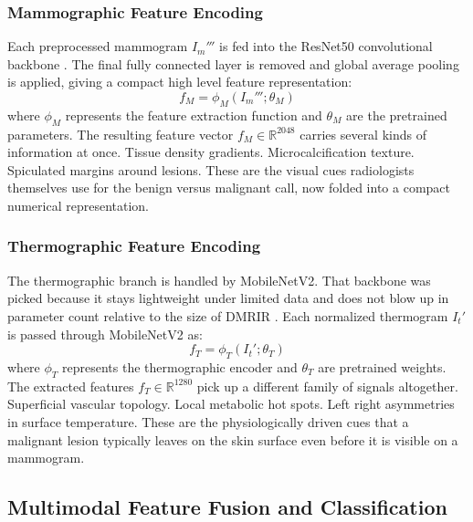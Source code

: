 \documentclass[lettersize,journal]{IEEEtran}
\begin{document}
\subsubsection{Mammographic Feature Encoding}

Each preprocessed mammogram $I_m'''$ is fed into the ResNet50 convolutional backbone \cite{He2016ResNet}. The final fully connected layer is removed and global average pooling is applied, giving a compact high level feature representation:
\begin{equation}
f_M = \phi_M(I_m'''; \theta_M)
\label{eq:resnet}
\end{equation}
where $\phi_M$ represents the feature extraction function and $\theta_M$ are the pretrained parameters. The resulting feature vector $f_M \in \mathbb{R}^{2048}$ carries several kinds of information at once. Tissue density gradients. Microcalcification texture. Spiculated margins around lesions. These are the visual cues radiologists themselves use for the benign versus malignant call, now folded into a compact numerical representation.

\subsubsection{Thermographic Feature Encoding}

The thermographic branch is handled by MobileNetV2. That backbone was picked because it stays lightweight under limited data and does not blow up in parameter count relative to the size of DMR\textendash IR \cite{Sandler2018MobileNetV2}. Each normalized thermogram $I_t'$ is passed through MobileNetV2 as:
\begin{equation}
f_T = \phi_T(I_t'; \theta_T)
\label{eq:mobilenet}
\end{equation}
where $\phi_T$ represents the thermographic encoder and $\theta_T$ are pretrained weights. The extracted features $f_T \in \mathbb{R}^{1280}$ pick up a different family of signals altogether. Superficial vascular topology. Local metabolic hot spots. Left right asymmetries in surface temperature. These are the physiologically driven cues that a malignant lesion typically leaves on the skin surface even before it is visible on a mammogram.

\subsection{Multimodal Feature Fusion and Classification}
\end{document}
